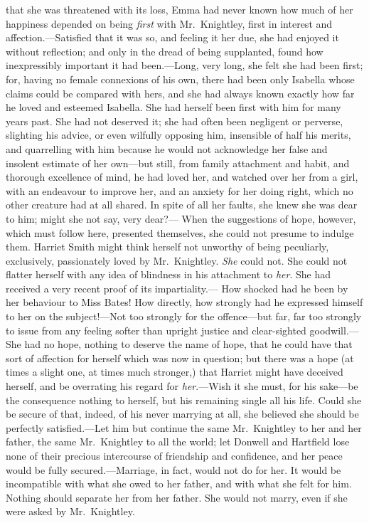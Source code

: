  that she was threatened with its loss, Emma had never known
how much of her happiness depended on being \emph{first} with Mr.\ Knightley,
first in interest and affection.---Satisfied that it was so,
and feeling it her due, she had enjoyed it without reflection;
and only in the dread of being supplanted, found how inexpressibly
important it had been.---Long, very long, she felt she had been first;
for, having no female connexions of his own, there had been
only Isabella whose claims could be compared with hers, and she
had always known exactly how far he loved and esteemed Isabella.
She had herself been first with him for many years past.
She had not deserved it; she had often been negligent or perverse,
slighting his advice, or even wilfully opposing him, insensible of
half his merits, and quarrelling with him because he would not
acknowledge her false and insolent estimate of her own---but still,
from family attachment and habit, and thorough excellence of mind,
he had loved her, and watched over her from a girl, with an endeavour
to improve her, and an anxiety for her doing right, which no
other creature had at all shared.  In spite of all her faults,
she knew she was dear to him; might she not say, very dear?---%
When the suggestions of hope, however, which must follow here,
presented themselves, she could not presume to indulge them.
Harriet Smith might think herself not unworthy of being peculiarly,
exclusively, passionately loved by Mr.\ Knightley.  \emph{She} could not.
She could not flatter herself with any idea of blindness in his attachment
to \emph{her}.  She had received a very recent proof of its impartiality.---%
How shocked had he been by her behaviour to Miss Bates!  How directly,
how strongly had he expressed himself to her on the subject!---Not too
strongly for the offence---but far, far too strongly to issue from
any feeling softer than upright justice and clear-sighted goodwill.---%
She had no hope, nothing to deserve the name of hope, that he could
have that sort of affection for herself which was now in question;
but there was a hope (at times a slight one, at times much stronger,)
that Harriet might have deceived herself, and be overrating his
regard for \emph{her}.---Wish it she must, for his sake---be the consequence
nothing to herself, but his remaining single all his life.
Could she be secure of that, indeed, of his never marrying at all,
she believed she should be perfectly satisfied.---Let him but continue
the same Mr.\ Knightley to her and her father, the same Mr.\ Knightley
to all the world; let Donwell and Hartfield lose none of their
precious intercourse of friendship and confidence, and her peace
would be fully secured.---Marriage, in fact, would not do for her.
It would be incompatible with what she owed to her father, and with
what she felt for him.  Nothing should separate her from her father.
She would not marry, even if she were asked by Mr.\ Knightley.

